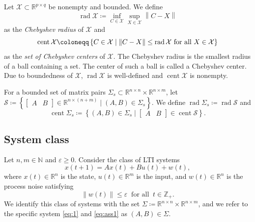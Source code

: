 \documentclass[journal,twoside,web]{ieeecolor}
\DeclareMathOperator{\rad}{rad}
\DeclareMathOperator{\cent}{cent}
\newcommand{\set}[2]{\left\{#1 \mid #2\right\}}
\newcommand{\norm}[1]{\left\|#1\right\|}
\begin{document}
Let $\mathcal{X}\subset\mathbb{R}^{p\times q}$ be nonempty and bounded. We define 
\begin{equation}
\label{eq:cheb}
\rad \mathcal{X}\coloneqq \inf_{C\in\mathcal{X}} \sup_{X\in\mathcal{X}} \norm{C-X}
\end{equation}
as the \emph{Chebyshev radius} of $\mathcal{X}$ and
\begin{equation}
\label{eq:cent}
\cent\mathcal{X}\coloneqq\set{C\in\mathcal{X}}{\norm{C-X}\leq\rad\mathcal{X} \textup{ for all }X\in\mathcal{X}}
\end{equation}
as the \emph{set of Chebyshev centers} of $\mathcal{X}$. The Chebyshev radius is the smallest radius of a ball containing a set. The center of such a ball is called a Chebyshev center. Due to boundedness of $\mathcal{X}$, $\rad\mathcal{X}$ is well-defined and $\cent\mathcal{X}$ is nonempty. 

For a bounded set of matrix pairs $\Sigma_s\subset\mathbb{R}^{n\times n}\times \mathbb{R}^{n\times m}$, let $\mathcal{S}\coloneqq\set{\begin{bmatrix}
A \!\!&\!\! B
\end{bmatrix}\in\mathbb{R}^{n\times(n+m)}}{(A,B)\in\Sigma_s}$. We define $\rad\Sigma_s\coloneqq\rad\mathcal{S}$ and
\begin{equation}
\cent\Sigma_s\coloneqq\set{(A,B)\in\Sigma_s}{\begin{bmatrix}
A \!\!&\!\! B
\end{bmatrix}\in\cent\mathcal{S}}.
\end{equation}



\subsection{System class}

Let $n,m\in\mathbb{N}$ and $\varepsilon\geq 0$. Consider the class of LTI systems
\begin{equation}
\label{eq:1}
x(t+1)=Ax(t)+Bu(t)+w(t),
\end{equation}
where $x(t)\in\mathbb{R}^n$ is the state, $u(t)\in\mathbb{R}^{m}$ is the input, and $w(t)\in\mathbb{R}^n$ is the process noise satisfying 
\begin{equation}
\label{eq:ass1}
\norm{w(t)}\leq\varepsilon\ \text{ for all }\ t\in\mathbb{Z}_+.
\end{equation}
We identify this class of systems with the set \mbox{$\Sigma\coloneqq\mathbb{R}^{n\times n}\times\mathbb{R}^{n\times m}$}, and we refer to the specific system \eqref{eq:1} and \eqref{eq:ass1} as $(A,B)\in\Sigma$. 
\end{document}
